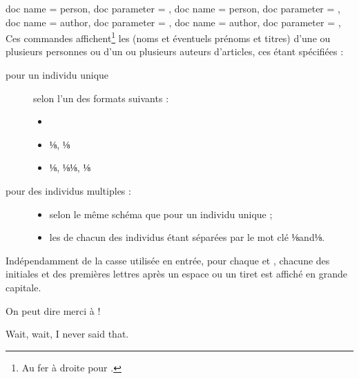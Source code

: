 \documentclass{letgut}
\begin{document}
\begin{docCommands}[
  doc name = person,
  doc name = author,
  ]
  {
    {
      doc name = person,
      doc parameter = 
    },
    {
      doc name = person,
      doc parameter = 
    },
    {
      doc name = author,
      doc parameter = 
    },
    {
      doc name = author,
      doc parameter = 
    },
  }
  Ces commandes affichent\footnote{Au fer à droite pour .} les
   (noms et éventuels prénoms et titres) d'une ou plusieurs
  personnes ou d'un ou plusieurs auteurs d'articles, ces 
  étant spécifiées :
  \begin{description}
  \item[pour un individu unique] selon l'un des formats suivants :
  \begin{itemize}
  \item {}
  \item {}⅛, ⅛
  \item {}⅛, ⅛⅛, ⅛
  \end{itemize}
\item[pour des individus multiples :]\leavevmode
  \begin{itemize}
  \item selon le même schéma que pour un individu unique ;
  \item les  de chacun des individus étant séparées par le mot clé
    ⅛and⅛.
  \end{itemize}
  \end{description}
\end{docCommands}

Indépendamment de la casse utilisée en entrée, pour chaque  et
, chacune des initiales et des premières lettres après un espace ou
un tiret est affiché en grande capitale.

\begin{ltx-code-result}[title addon=personnes]
On peut dire merci à
 !
\end{ltx-code-result}

\begin{ltx-code-result}[title addon=auteur,listing options app={deletekeywords={[3]{author}}}]
\begin{displayquote} %
  Wait, wait, I never said that.
  \author{knuth, dONALD e.}
\end{displayquote}
\end{ltx-code-result}
\end{document}
